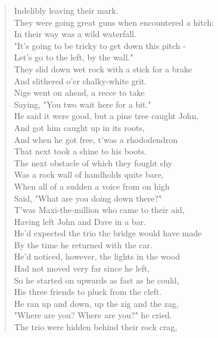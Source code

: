 \documentclass[a5paper,openany,font 10pt]{scrbook}
\begin{document}
\begin{verse}
Indelibly leaving their mark.\\
\vspace*{1em}
They were going great guns when encountered a hitch:\\
In their way was a wild waterfall.\\
"It's going to be tricky to get down this pitch -\\
Let's go to the left, by the wall."\\
They slid down wet rock with a stick for a brake\\
And slithered o'er chalky-white grit.\\
Nige went on ahead, a recce to take\\
Saying, "You two wait here for a bit."\\
\vspace*{1em}
He said it were good, but a pine tree caught John,\\
And got him caught up in its roots,\\
And when he got free, t'was a rhododendron\\
That next took a shine to his boots.\\
\vspace*{1em}
The next obstacle of which they fought shy\\
Was a rock wall of handholds quite bare,\\
When all of a sudden a voice from on high\\
Said, "What are you doing down there?"\\
\vspace*{1em}
T'was Maxi-the-million who came to their aid,\\
Having left John and Dave in a bar.\\
He'd expected the trio the bridge would have made\\
By the time he returned with the car.\\
\vspace*{1em}
He'd noticed, however, the lights in the wood\\
Had not moved very far since he left,\\
So he started on upwards as fast as he could,\\
His three friends to pluck from the cleft.\\
\vspace*{1em}
He ran up and down, up the zig and the zag,\\
"Where are you? Where are you?" he cried.\\
The trio were hidden behind their rock crag,\\

\end{verse}
\end{document}
